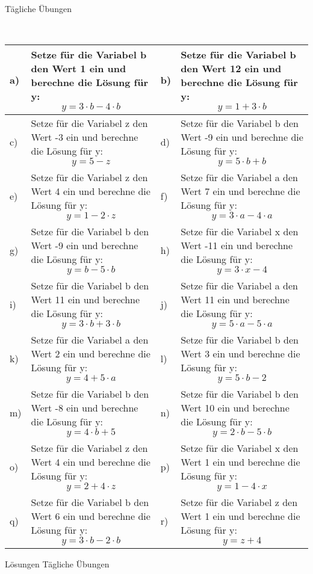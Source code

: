 \documentclass[12pt]{article}
\begin{document}
\centerline{{\Large Tägliche Übungen}} 
\vspace{1cm}
\noindent \\


\begin{xltabular}{\textwidth}{|C{0.75cm}|X|C{0.75cm}|X|}
\hline
a)&Setze für die Variabel b den Wert 1 ein und berechne die Lösung für y:$$y=3 \cdot b - 4 \cdot b$$
&
b)&Setze für die Variabel b den Wert 12 ein und berechne die Lösung für y:$$y=1 + 3 \cdot b$$
\\\hline
c)&Setze für die Variabel z den Wert -3 ein und berechne die Lösung für y:$$y=5 - z$$
&
d)&Setze für die Variabel b den Wert -9 ein und berechne die Lösung für y:$$y=5 \cdot b + b$$
\\\hline
e)&Setze für die Variabel z den Wert 4 ein und berechne die Lösung für y:$$y=1 - 2 \cdot z$$
&
f)&Setze für die Variabel a den Wert 7 ein und berechne die Lösung für y:$$y=3 \cdot a - 4 \cdot a$$
\\\hline
g)&Setze für die Variabel b den Wert -9 ein und berechne die Lösung für y:$$y=b - 5 \cdot b$$
&
h)&Setze für die Variabel x den Wert -11 ein und berechne die Lösung für y:$$y=3 \cdot x - 4$$
\\\hline
i)&Setze für die Variabel b den Wert 11 ein und berechne die Lösung für y:$$y=3 \cdot b + 3 \cdot b$$
&
j)&Setze für die Variabel a den Wert 11 ein und berechne die Lösung für y:$$y=5 \cdot a - 5 \cdot a$$
\\\hline
k)&Setze für die Variabel a den Wert 2 ein und berechne die Lösung für y:$$y=4 + 5 \cdot a$$
&
l)&Setze für die Variabel b den Wert 3 ein und berechne die Lösung für y:$$y=5 \cdot b - 2$$
\\\hline
m)&Setze für die Variabel b den Wert -8 ein und berechne die Lösung für y:$$y=4 \cdot b + 5$$
&
n)&Setze für die Variabel b den Wert 10 ein und berechne die Lösung für y:$$y=2 \cdot b - 5 \cdot b$$
\\\hline
o)&Setze für die Variabel z den Wert 4 ein und berechne die Lösung für y:$$y=2 + 4 \cdot z$$
&
p)&Setze für die Variabel x den Wert 1 ein und berechne die Lösung für y:$$y=1 - 4 \cdot x$$
\\\hline
q)&Setze für die Variabel b den Wert 6 ein und berechne die Lösung für y:$$y=3 \cdot b - 2 \cdot b$$
&
r)&Setze für die Variabel z den Wert 1 ein und berechne die Lösung für y:$$y=z + 4$$
\\\hline
\end{xltabular}
\vspace{0.5cm}
\newpage
{}
\centerline{{\large Lösungen Tägliche Übungen}} 
\vspace{0.5cm}
\end{document}
